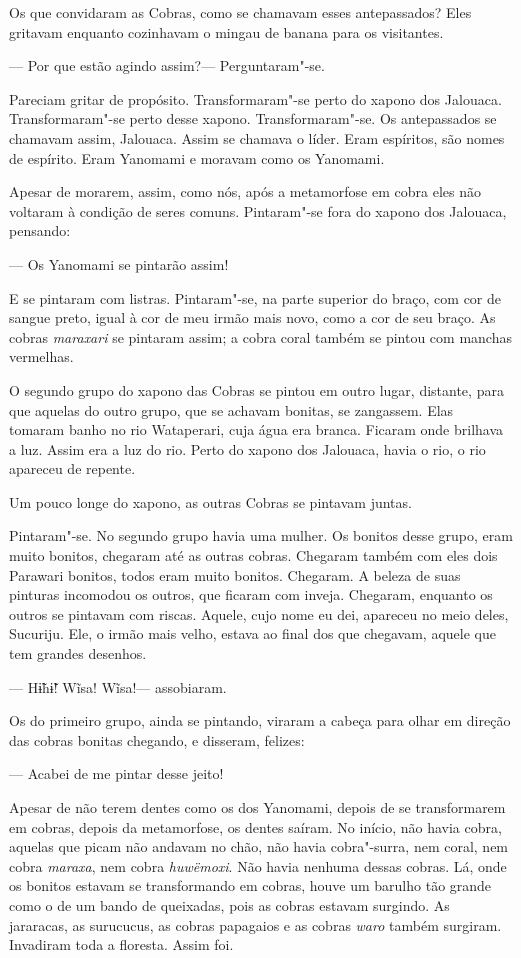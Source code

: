 Os que convidaram as Cobras, como se chamavam esses antepassados? Eles
gritavam enquanto cozinhavam o mingau de banana para os visitantes. 

--- Por que estão agindo assim?--- Perguntaram"-se.

Pareciam gritar de propósito. Transformaram"-se perto do xapono dos
Jalouaca. Transformaram"-se perto desse xapono. Transformaram"-se. Os
antepassados se chamavam assim, Jalouaca. Assim se chamava o líder. Eram
espíritos, são nomes de espírito. Eram Yanomami e moravam como os
Yanomami. 

Apesar de morarem, assim, como nós, após a metamorfose em cobra eles não
voltaram à condição de seres comuns. Pintaram"-se fora do xapono dos
Jalouaca, pensando: 

--- Os Yanomami se pintarão assim! 

E se pintaram com listras. Pintaram"-se, na parte superior do braço, com
cor de sangue preto, igual à cor de meu irmão mais novo, como a cor de
seu braço. As cobras \emph{maraxari} se pintaram assim; a cobra coral
também se pintou com manchas vermelhas. 

O segundo grupo do xapono das Cobras se pintou em outro lugar, distante,
para que aquelas do outro grupo, que se achavam bonitas, se zangassem.
Elas tomaram banho no rio Wataperari, cuja água era branca. Ficaram onde
brilhava a luz. Assim era a luz do rio. Perto do xapono dos Jalouaca,
havia o rio, o rio apareceu de repente. 

Um pouco longe do xapono, as outras Cobras se pintavam juntas. 

Pintaram"-se. No segundo grupo havia uma mulher. Os bonitos desse
grupo, eram muito bonitos, chegaram até as outras cobras. Chegaram
também com eles dois Parawari bonitos, todos eram muito bonitos.
Chegaram. A beleza de suas pinturas incomodou os outros, que ficaram com
inveja. Chegaram, enquanto os outros se pintavam com riscas. Aquele,
cujo nome eu dei, apareceu no meio deles, Sucuriju. Ele, o irmão mais
velho, estava ao final dos que chegavam, aquele que tem grandes
desenhos.

--- Hɨ̃hɨ̃! Wĩsa! Wĩsa!--- assobiaram. 

Os do primeiro grupo, ainda se pintando, viraram a cabeça para olhar em
direção das cobras bonitas chegando, e disseram, felizes:

--- Acabei de me pintar desse jeito! 

Apesar de não terem dentes como os dos Yanomami, depois de se
transformarem em cobras, depois da metamorfose, os dentes saíram. No
início, não havia cobra, aquelas que picam não andavam no chão, não
havia cobra"-surra, nem coral, nem cobra \emph{maraxa}, nem
cobra \emph{huwëmoxi}. Não havia nenhuma dessas cobras. Lá, onde os
bonitos estavam se transformando em cobras, houve um barulho tão grande
como o de um bando de queixadas, pois as cobras estavam surgindo. As
jararacas, as surucucus, as cobras papagaios e as
cobras \emph{waro} também surgiram. Invadiram toda a floresta. Assim foi. 

